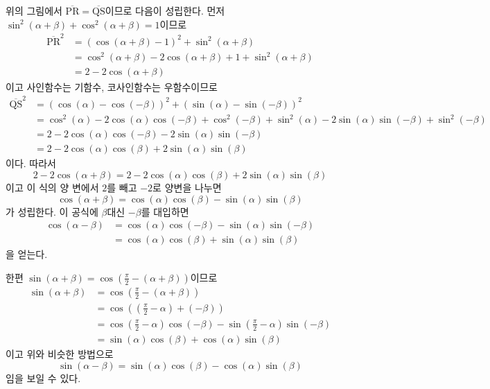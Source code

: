 \documentclass[11pt, a4paper]{book}
\begin{document}
위의 그림에서 $\overline{\textrm{PR}} = \overline{\textrm{QS}}$이므로 다음이 성립한다. 먼저 $\sin^{2}\left(\alpha+\beta\right) +\cos^{2}\left(\alpha +\beta\right)=1$이므로
\begin{align*}
\overline{\textrm{PR}}^{2} &= \left(\cos (\alpha + \beta) - 1\right)^{2} + \sin^{2}(\alpha + \beta)\\
	&= \cos^{2}(\alpha + \beta) - 2 \cos (\alpha + \beta) + 1 + \sin^{2}(\alpha + \beta) \\
	&= 2 - 2\cos (\alpha + \beta)
\end{align*}
이고 사인함수는 {\color{red}기함수}, 코사인함수는 {\color{red}우함수}이므로
\begin{align*}
	\overline{\textrm{QS}}^{2} &= \left(\cos(\alpha) - \cos (-\beta)\right)^{2} + \left(\sin(\alpha) - \sin (-\beta)\right)^{2}\\
	&= \cos^{2}(\alpha) - 2 \cos(\alpha) \cos(-\beta) + \cos^{2}(-\beta) + \sin^{2}(\alpha) - 2 \sin(\alpha) \sin(-\beta) + \sin^{2}(-\beta)\\
	&= 2 - 2\cos(\alpha) \cos(-\beta) - 2\sin(\alpha) \sin(-\beta)\\
	&= 2 - 2 \cos(\alpha) \cos(\beta)	+ 2 \sin(\alpha)\sin(\beta)
\end{align*}
이다. 따라서
\[
2-2\cos\left(\alpha+\beta\right) = 2 - 2 \cos(\alpha)\cos(\beta) + 2 \sin(\alpha)\sin(\beta)
\]
이고 이 식의 양 변에서 $2$를 빼고 $-2$로 양변을 나누면
\[
\cos(\alpha + \beta) = \cos(\alpha)\cos(\beta) - \sin(\alpha)\sin(\beta)
\]
가 성립한다. 이 공식에 $\beta$대신 $-\beta$를 대입하면
\begin{align*}
\cos(\alpha - \beta) &= \cos(\alpha)\cos(-\beta) - \sin(\alpha)\sin(-\beta)\\
&= \cos(\alpha)\cos(\beta) + \sin(\alpha)\sin(\beta)
\end{align*}
을 얻는다. 

  한편 $\sin(\alpha+\beta) =\cos\left(\frac{\pi}{2}-\left(\alpha+\beta \right) \right)$이므로 
 \begin{align*}
	\sin(\alpha+\beta) &=\cos\left(\frac{\pi}{2}-(\alpha+\beta)\right) \\
	&=\cos\left(\left(\frac{\pi}{2}-\alpha \right) +(-\beta)\right)\\
	&=\cos\left(\frac{\pi}{2}-\alpha\right) \cos(-\beta) - \sin \left(\frac{\pi}{2}-\alpha\right) \sin(-\beta) \\
	&= \sin(\alpha) \cos(\beta) + \cos(\alpha)\sin(\beta)
\end{align*}
이고 위와 비슷한 방법으로 
\[
\sin\left(\alpha-\beta\right) =\sin(\alpha)\cos(\beta) - \cos(\alpha)\sin(\beta)
\]
임을 보일 수 있다.
\end{document}
